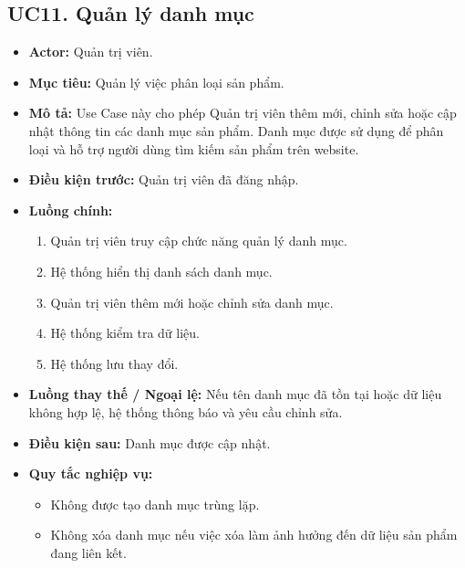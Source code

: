 \documentclass[12pt,a4paper]{article}
\begin{document}
\subsection*{UC11. Quản lý danh mục}

\begin{itemize}

    \item \textbf{Actor:} Quản trị viên.

    \item \textbf{Mục tiêu:} Quản lý việc phân loại sản phẩm.

    \item \textbf{Mô tả:} Use Case này cho phép Quản trị viên thêm mới, chỉnh sửa hoặc cập nhật thông tin các danh mục sản phẩm. Danh mục được sử dụng để phân loại và hỗ trợ người dùng tìm kiếm sản phẩm trên website.

    \item \textbf{Điều kiện trước:} Quản trị viên đã đăng nhập.

    \item \textbf{Luồng chính:}
    \begin{enumerate}
        \item Quản trị viên truy cập chức năng quản lý danh mục.
        \item Hệ thống hiển thị danh sách danh mục.
        \item Quản trị viên thêm mới hoặc chỉnh sửa danh mục.
        \item Hệ thống kiểm tra dữ liệu.
        \item Hệ thống lưu thay đổi.
    \end{enumerate}

    \item \textbf{Luồng thay thế / Ngoại lệ:} Nếu tên danh mục đã tồn tại hoặc dữ liệu không hợp lệ, hệ thống thông báo và yêu cầu chỉnh sửa.

    \item \textbf{Điều kiện sau:} Danh mục được cập nhật.

    \item \textbf{Quy tắc nghiệp vụ:}
    \begin{itemize}
        \item Không được tạo danh mục trùng lặp.
        \item Không xóa danh mục nếu việc xóa làm ảnh hưởng đến dữ liệu sản phẩm đang liên kết.
    \end{itemize}

\end{itemize}
\end{document}
